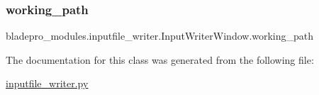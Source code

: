 \subsubsection{\texorpdfstring{working\+\_\+path}{working\_path}}
{\footnotesize\ttfamily bladepro\+\_\+modules.\+inputfile\+\_\+writer.\+Input\+Writer\+Window.\+working\+\_\+path}



The documentation for this class was generated from the following file\+:\begin{DoxyCompactItemize}
\item 
\hyperlink{inputfile__writer_8py}{inputfile\+\_\+writer.\+py}\end{DoxyCompactItemize}
